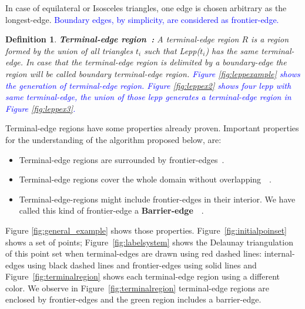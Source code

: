 \documentclass[pdflatex,sn-mathphys]{sn-jnl}%
\theoremstyle{thmstyleone}%
\theoremstyle{thmstyletwo}%
\theoremstyle{thmstylethree}%
\newtheorem{definition}{Definition}%
\begin{document}
In case of equilateral or Isosceles triangles, one edge is chosen arbitrary as the longest-edge. \textcolor{blue}{ Boundary edges, by simplicity, are considered as frontier-edge.}


\begin{definition}{\textbf{Terminal-edge region~\cite{Ascom209}:}}
\label{d:terminaledgeregion}
A {\em terminal-edge region} $R$ is a region formed by the union of all triangles $t_i$ such that Lepp($t_i$) has the same terminal-edge.  In case that the terminal-edge region  is delimited by a boundary-edge the region will be called {\em boundary terminal-edge region}. \textcolor{blue}{ Figure \ref{fig:leppexample} shows the generation of terminal-edge region. Figure \ref{fig:leppex2} shows four lepp with same terminal-edge, the union of those lepp generates a terminal-edge region in Figure \ref{fig:leppex3}.}
\end{definition}


\noindent
Terminal-edge regions have some properties already proven. Important properties for the understanding of the algorithm proposed below, are: 

\begin{itemize}
    \item Terminal-edge regions are surrounded by frontier-edges~\cite{Ascom209}.
    \item Terminal-edge regions cover the whole domain without overlapping~\cite{Ascom209}~\cite{Ojeda2018ANA}.
    \item Terminal-edge-regions might include frontier-edges in their interior. We have called this kind of frontier-edge a \textbf{Barrier-edge}~\cite{Ascom209}~\cite{Ojeda2018ANA}.
  
\end{itemize}
\noindent



\noindent
Figure \ref{fig:general_example} shows those properties. Figure~\ref{fig:initialpoinset} shows a set of points; Figure~\ref{fig:labelsystem} shows the Delaunay triangulation of this point set when terminal-edges are drawn using red dashed lines: internal-edges using black dashed lines and frontier-edges using  solid lines and Figure~\ref{fig:terminalregion} shows each terminal-edge region using a different color. We observe in Figure~\ref{fig:terminalregion} terminal-edge regions are enclosed by frontier-edges and the green region includes a barrier-edge.
\end{document}
